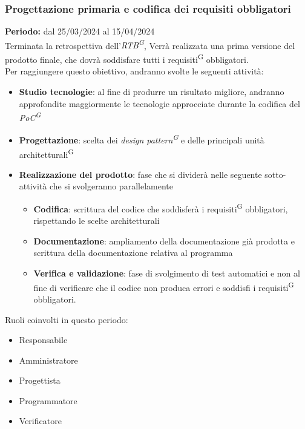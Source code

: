 \documentclass[5pt]{article}
\begin{document}
    \subsubsection{Progettazione primaria e codifica dei requisiti obbligatori}
      \textbf{Periodo:} dal 25/03/2024 al 15/04/2024 
      \vspace{0.3cm} \\
      Terminata la retrospettiva dell'\textit{RTB\textsuperscript{G}}, Verrà realizzata una prima versione del prodotto finale, che dovrà soddisfare tutti i requisiti\textsuperscript{G} obbligatori. \\
      Per raggiungere questo obiettivo, andranno svolte le seguenti attività:
      \begin{itemize}
        \item \textbf{Studio tecnologie}: al fine di produrre un risultato migliore, andranno approfondite maggiormente le tecnologie approcciate 
        durante la codifica del \textit{PoC\textsuperscript{G}}
        \item \textbf{Progettazione}: scelta dei \textit{design pattern\textsuperscript{G}} e delle principali unità architetturali\textsuperscript{G}
        \item \textbf{Realizzazione del prodotto}: fase che si dividerà nelle seguente sotto-attività che si svolgeranno parallelamente
        \begin{itemize}
          \item \textbf{Codifica}: scrittura del codice che soddisferà i requisiti\textsuperscript{G} obbligatori, rispettando le scelte architetturali
          \item \textbf{Documentazione}: ampliamento della documentazione già prodotta e scrittura della documentazione relativa al programma
          \item \textbf{Verifica e validazione}: fase di svolgimento di test automatici e non al fine di verificare che il codice non produca errori e soddisfi i requisiti\textsuperscript{G} obbligatori.
        \end{itemize}  
      \end{itemize}
      Ruoli coinvolti in questo periodo:
      \begin{itemize}
          \item Responsabile
          \item Amministratore
          \item Progettista
          \item Programmatore
          \item Verificatore
      \end{itemize}
    
\end{document}
